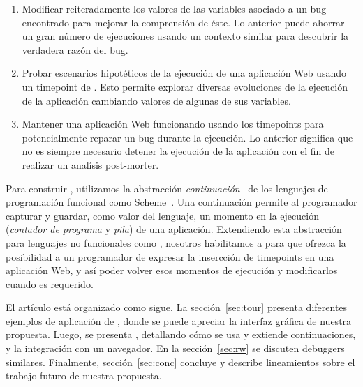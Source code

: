 \documentclass[conference]{IEEEtran}
\begin{document}
\begin{enumerate}
	
	\item Modificar reiteradamente los valores de las variables asociado a un bug encontrado para mejorar la comprensi\'on de \'este. Lo anterior puede ahorrar un gran n\'umero de ejecuciones usando un contexto similar para descubrir la verdadera raz\'on del bug.

	\smallskip

	\item Probar escenarios hipot\'eticos de la ejecuci\'on de una aplicaci\'on Web usando un timepoint de \deloreanjs. Esto permite explorar diversas evoluciones de la ejecuci\'on de la aplicaci\'on cambiando valores de algunas de sus variables.
   
   \smallskip
	 
	\item Mantener una aplicaci\'on Web funcionando usando los timepoints para potencialmente reparar un bug durante la ejecuci\'on. Lo anterior significa que no es siempre necesario detener la ejecuci\'on de la aplicaci\'on con el fin de realizar un anal\'isis post-morter.  

\end{enumerate}


Para construir \deloreanjs, utilizamos la abstracci\'on {\em continuaci\'on}~\cite{fw84} de los lenguajes de programaci\'on funcional como Scheme~\cite{scheme48}. Una continuaci\'on permite al programador capturar y guardar, como valor del lenguaje, un momento en la ejecuci\'on ({\em contador de programa} y {\em pila}) de una aplicaci\'on. Extendiendo esta abstracci\'on para lenguajes no funcionales como \javascript, nosotros habilitamos a \deloreanjs para que ofrezca la posibilidad a un programador de expresar la insercci\'on de timepoints en una aplicaci\'on Web,  y as\'i poder volver esos momentos de ejecuci\'on y modificarlos cuando es requerido.   


El art\'iculo est\'a organizado como sigue. La secci\'on~\ref{sec:tour} presenta diferentes ejemplos de aplicaci\'on de \deloreanjs, donde se puede apreciar la interfaz gr\'afica de nuestra propuesta. Luego, se presenta \deloreanjs, detallando c\'omo se usa y extiende continuaciones, y la integraci\'on con un navegador. En la secci\'on~\ref{sec:rw} se discuten debuggers similares. Finalmente, secci\'on~\ref{sec:conc} concluye y describe lineamientos sobre el trabajo futuro de nuestra propuesta.      

\smallskip
\end{document}
